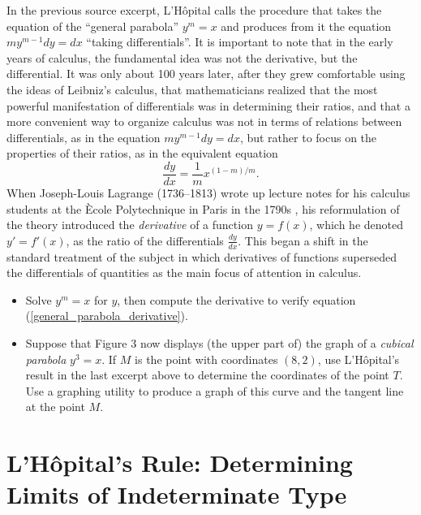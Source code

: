 \message{ !name(LHopitalsRule_2021.03.29.tex)}\documentclass[11pt]{article}
\newcounter{tasknumb}
\newcommand{\tasknumb}[1]{\refstepcounter{tasknumb}\textmd{\textbf{$\fbox{$\fbox{Task \thetasknumb}$}$}}#1}
\newenvironment{task}[1][]%
 {\begin{itemize}
 \item[\tasknumb{#1}] }
{
    \end{itemize}    }%
\begin{document}
\bigskip
In the previous source excerpt, L'H\^opital calls the procedure that takes the equation of the ``general parabola'' $y^m=x$ and produces from it the equation $my^{m-1}dy=dx$ ``taking differentials''. It is important to note that in the early years of calculus, the fundamental idea was not the derivative, but the differential. It was only about 100 years later, after they grew comfortable using the ideas of Leibniz's calculus, that mathematicians realized that the most powerful manifestation of differentials was in determining their ratios, and that a more convenient way to organize calculus was not in terms of relations between differentials, as in the equation $my^{m-1}dy=dx$, but rather to focus on the properties of their ratios, as in the equivalent equation 
\begin{equation}\label{general_parabola_derivative}
\frac{dy}{dx}=\frac{1}{m}x^{(1-m)/m}.
\end{equation}
When Joseph-Louis Lagrange (1736--1813) wrote up lecture notes for his calculus students at the \`Ecole Polytechnique in Paris in the 1790s \citep{Lagrange}, his reformulation of the theory introduced the \emph{derivative} of a function $y=f(x)$, which he denoted $y'=f'(x)$, as the ratio of the differentials $\frac{dy}{dx}$. This began a shift in the standard treatment of the subject in which derivatives of functions superseded the differentials of quantities as the main focus of attention in calculus.

\bigskip
\begin{task}[\label{general_parabola}]
Solve $y^m=x$ for $y$, then compute the derivative to verify equation (\ref{general_parabola_derivative}).
 \end{task}

\bigskip
\begin{task}[\label{cubical_parabola}]
Suppose that Figure 3 now displays (the upper part of) the graph of a \emph{cubical parabola} $y^3=x$. If $M$ is the point with coordinates $(8,2)$, use L'H\^opital's result in the last excerpt above to determine the coordinates of the point $T$. Use a graphing utility to produce a graph of this curve and the tangent line at the point $M$.
 \end{task}

\bigskip
\section{L'H\^opital's Rule: Determining Limits of Indeterminate Type} 
\end{document}
